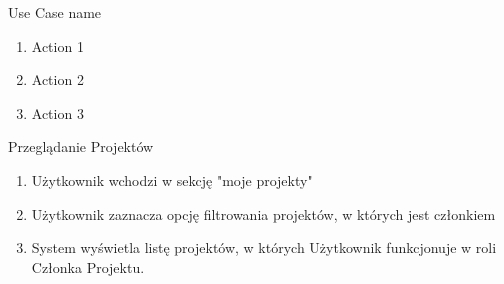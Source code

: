 \begin{usecase}{Use Case name}
	\begin{enumerate}
		\item Action 1
		\item Action 2
		\item Action 3
	\end{enumerate}
	\beginalternatives
	\precond{\todo}
	\postcond{\todo}
\end{usecase}


\begin{usecase}{Przeglądanie Projektów}
\label{przegladanie_projektow}
	\begin{enumerate}
      \item Użytkownik wchodzi w sekcję "moje projekty"
      \item Użytkownik zaznacza opcję filtrowania projektów, w których jest członkiem
      \item System wyświetla listę projektów, w których Użytkownik funkcjonuje w roli Członka Projektu.
	\end{enumerate}
\end{usecase}


